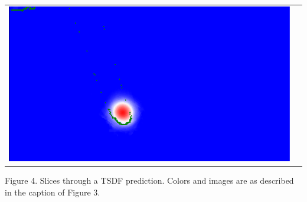 \documentclass[10pt,onecolumn,letterpaper]{article}
\begin{document}
\begin{tabular}{cc}
\includegraphics[height=\imheight]{real/statue/slice_00200.png}
\end{tabular}
\vspace{10pt}

{\centering \small Figure 4. Slices through a TSDF prediction. Colors and images are as described in the caption of Figure 3.}


{\small


}
\end{document}
